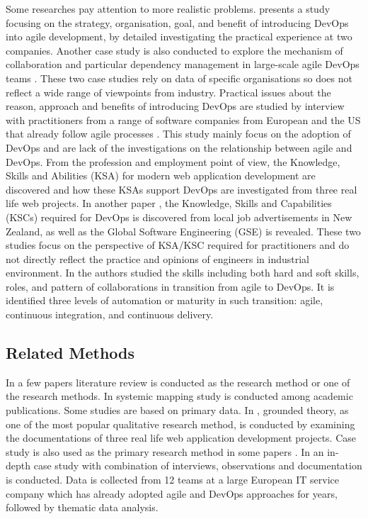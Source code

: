 \documentclass[
  12pt,
  a4paper,
]{article}
\begin{document}
Some researches pay attention to more realistic problems.
\citep{Elberzhager:2017:agile-to-devops} presents a study focusing on
the strategy, organisation, goal, and benefit of introducing DevOps into
agile development, by detailed investigating the practical experience at
two companies. Another case study is also conducted to explore the
mechanism of collaboration and particular dependency management in
large-scale agile DevOps teams \citep{stray:2019:dm-large}. These two
case studies rely on data of specific organisations so does not reflect
a wide range of viewpoints from industry. Practical issues about the
reason, approach and benefits of introducing DevOps are studied by
interview with practitioners from a range of software companies from
European and the US that already follow agile processes
\citep{erich:2017:devops-practice}. This study mainly focus on the
adoption of DevOps and are lack of the investigations on the
relationship between agile and DevOps. From the profession and
employment point of view, the Knowledge, Skills and Abilities (KSA) for
modern web application development are discovered and how these KSAs
support DevOps are investigated \citep{bang2013ksa} from three real life
web projects. In another paper \citep{hussain2017nz}, the Knowledge,
Skills and Capabilities (KSCs) required for DevOps is discovered from
local job advertisements in New Zealand, as well as the Global Software
Engineering (GSE) is revealed. These two studies focus on the
perspective of KSA/KSC required for practitioners and do not directly
reflect the practice and opinions of engineers in industrial
environment. In
\citep{Hemon2019:smart}\citep{hemon:2019:Conceptualizing-smarter} the
authors studied the skills including both hard and soft skills, roles,
and pattern of collaborations in transition from agile to DevOps. It is
identified three levels of automation or maturity in such transition:
agile, continuous integration, and continuous delivery.

\hypertarget{related-methods}{%
\subsection{Related Methods}\label{related-methods}}

In a few papers literature review is conducted as the research method or
one of the research methods. In \citep{Jabbari:2016:what-is-devops}
systemic mapping study is conducted among academic publications. Some
studies are based on primary data. In \citep{bang2013ksa}, grounded
theory, as one of the most popular qualitative research method, is
conducted by examining the documentations of three real life web
application development projects. Case study is also used as the primary
research method in some papers \citep{erich:2017:devops-practice}
\citep{stray:2019:dm-large}. In \citep{Hemon2019:smart}
\citep{hemon:2019:Conceptualizing-smarter} an in-depth case study with
combination of interviews, observations and documentation is conducted.
Data is collected from 12 teams at a large European IT service company
which has already adopted agile and DevOps approaches for years,
followed by thematic data analysis.
\end{document}
